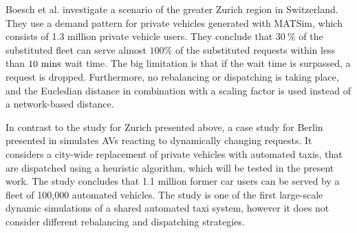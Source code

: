 Boesch et al. \cite{boesch2016autonomous} investigate a scenario of the greater
Zurich region in Switzerland. They use a demand pattern for private vehicles
generated with MATSim, which consists of 1.3 million private vehicle users.
They conclude that $30 ~ \%$ of the substituted fleet can serve almost $100 \%$ of the substituted
requests within less than $10 ~ \textnormal{mins}$ wait time. The big limitation
is that if the wait time is surpassed, a request is dropped. Furthermore, no rebalancing
or dispatching is taking place, and the Eucledian distance in combination with a scaling factor is
used instead of a network-based distance. %

In contrast to the study for Zurich presented above, a case study for Berlin
presented in \cite{bischoff2016simulation} simulates AVs reacting to dynamically changing requests.
It considers a city-wide replacement of private vehicles with automated taxis, that
are dispatched using a heuristic algorithm, which will be tested in the present work.
 The study concludes that 1.1 million former car users can be served by a fleet
 of 100,000 automated vehicles.
The study is one of the first large-scale dynamic
 simulations of a shared automated taxi system, however it does not consider
 different rebalancing and dispatching strategies.

